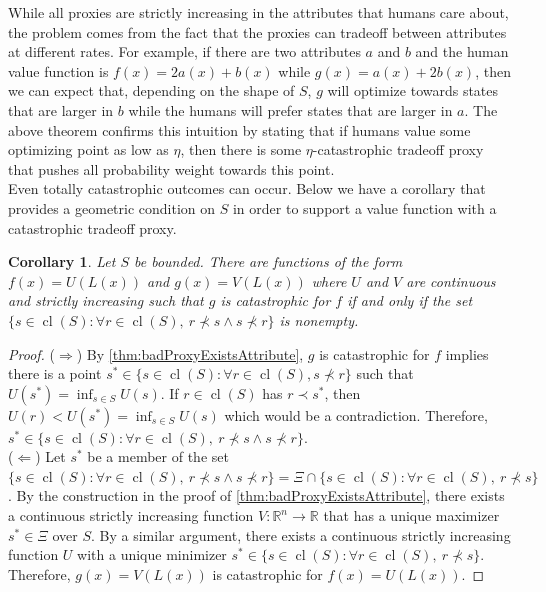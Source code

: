 \documentclass{article}
\newtheorem{Corollary}{Corollary}[section] \crefname{Corollary}{Corollary}{Corollaries}
\DeclareMathOperator*{\cl}{cl}
\begin{document}
While all proxies are strictly increasing in the attributes that humans care about, the problem comes from the fact that the proxies can tradeoff between attributes at different rates. For example, if there are two attributes $a$ and $b$ and the human value function is $f(x) = 2a(x) + b(x)$ while $g(x) = a(x) + 2b(x)$, then we can expect that, depending on the shape of $S$, $g$ will optimize towards states that are larger in $b$ while the humans will prefer states that are larger in $a$. The above theorem confirms this intuition by stating that if humans value some optimizing point as low as $\eta$, then there is some $\eta$-catastrophic tradeoff proxy that pushes all probability weight towards this point.\\

Even totally catastrophic outcomes can occur. Below we have a corollary that provides a geometric condition on $S$ in order to support a value function with a catastrophic tradeoff proxy.

\begin{Corollary}\label{cor:badProxyExistsAttributeGeometric}
Let $S$ be bounded. There are functions of the form $f(x) = U(L(x))$ and $g(x) = V(L(x))$ where $U$ and $V$ are continuous and strictly increasing such that $g$ is catastrophic for $f$ if and only if the set $\{s \in \cl(S) : \forall r \in \cl(S), \ r \not\prec s \wedge s \not\prec r\}$ is nonempty.
\end{Corollary}

\begin{proof}
($\Longrightarrow$) By \cref{thm:badProxyExistsAttribute}, $g$ is catastrophic for $f$ implies there is a point $s^* \in \{s \in \cl(S) : \forall r \in \cl(S), s \not\prec r\}$ such that $U(s^*) = \inf_{s \in S} U(s)$. If $r \in \cl(S)$ has $r \prec s^*$, then $U(r) < U(s^*) = \inf_{s \in S} U(s)$ which would be a contradiction. Therefore, $s^* \in \{s \in \cl(S) : \forall r \in \cl(S), \ r \not\prec s \wedge s \not\prec r\}$.\\

($\Longleftarrow$) Let $s^*$ be a member of the set $\{s \in \cl(S) : \forall r \in \cl(S), \ r \not\prec s \wedge s \not\prec r\} = \Xi \cap \{s \in \cl(S) : \forall r \in \cl(S), \ r \not\prec s\}$. By the construction in the proof of \cref{thm:badProxyExistsAttribute}, there exists a continuous strictly increasing function $V : \mathbb R^n \rightarrow \mathbb R$ that has a unique maximizer $s^* \in \Xi$ over $S$. By a similar argument, there exists a continuous strictly increasing function $U$ with a unique minimizer $s^* \in \{s \in \cl(S) : \forall r \in \cl(S), \ r \not\prec s\}$. Therefore, $g(x) = V(L(x))$ is catastrophic for $f(x) = U(L(x))$.
\end{proof}
\end{document}
